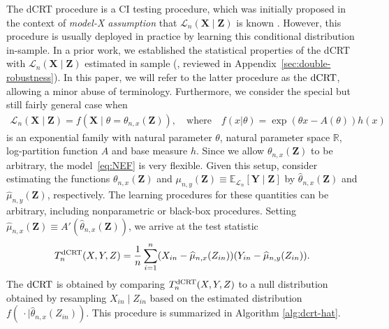\documentclass[12pt]{article}
\theoremstyle{definition}
\newcommand{\E}{\mathbb E}								%
\newcommand{\R}{\mathbb{R}}								%
\newcommand{\prx}{\bm X}								%
\newcommand{\srx}{X}									%
\newcommand{\prz}{\bm Z}								%
\newcommand{\srz}{Z}									%
\newcommand{\pry}{{\bm Y}}								%
\newcommand{\sry}{Y}									%
\newcommand{\law}{\mathcal L}							%
\newcommand{\dCRT}{\textnormal{dCRT}} 					%
\begin{document}
  The dCRT procedure \citep{Liu2022a} is a CI testing procedure, which was initially proposed in the context of \textit{model-X assumption} that $\law_n(\prx \mid \prz)$ is known \citep{CetL16}. However, this procedure is usually deployed in practice by learning this conditional distribution in-sample. In a prior work, we established the statistical properties of the dCRT with $\law_n(\prx \mid \prz)$ estimated in sample (\cite{Niu2022a}, reviewed in Appendix~\ref{sec:double-robustness}). In this paper, we will refer to the latter procedure as the $\dCRT$, allowing a minor abuse of terminology. Furthermore, we consider the special but still fairly general case when
  \begin{align}\label{eq:NEF}
    \law_n(\prx \mid \prz) = f(\prx \mid \theta = \theta_{n,x}(\prz)), \quad\text{where}\quad f(x|\theta)=\exp(\theta x -A(\theta))h(x)
  \end{align}
  is an exponential family with natural parameter $\theta$, natural parameter space $\R$, log-partition function $A$ and base measure $h$. Since we allow $\theta_{n,x}(\prz)$ to be arbitrary, the model~\eqref{eq:NEF} is very flexible. Given this setup, consider estimating the functions $\theta_{n,x}(\prz)$ and $\mu_{n,y}(\prz) \equiv \E_{\law_n}[\pry \mid \prz]$ by $\widehat{\theta}_{n,x}(\prz)$ and $\widehat \mu_{n,y}(\prz)$, respectively. The learning procedures for these quantities can be arbitrary, including nonparametric or black-box procedures. Setting $\widehat \mu_{n,x}(\prz) \equiv A'(\widehat{\theta}_{n,x}(\prz))$, we arrive at the test statistic 
  \begin{align}\label{eq:dCRThat}
	  T_n^{\dCRT}(X,Y,Z)
	=\frac{1}{n}\sum_{i=1}^{n}(\srx_{in}-\widehat\mu_{n,x}(\srz_{in}))(\sry_{in}-\widehat{\mu}_{n,y}(\srz_{in})).
  \end{align}
  The $\dCRT$ is obtained by comparing $T_n^{\dCRT}(\srx, \sry, \srz)$ to a null distribution obtained by resampling $\srx_{in} \mid \srz_{in}$ based on the estimated distribution $f(\ \cdot \mid \widehat \theta_{n,x}(Z_{in})).$ This procedure is summarized in Algorithm \ref{alg:dcrt-hat}. 
\end{document}

